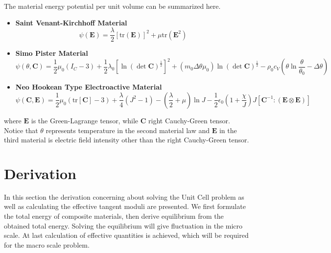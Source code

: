 \documentclass[10pt,a4paper]{scrreprt}
\begin{document}
The material energy potential per unit volume can be summarized here.
\begin{itemize}
	\item[] \textbf{Saint Venant-Kirchhoff Material} \citep{marsden_mathematical_1994}
	\begin{equation}
	\label{eq: svk}
	\psi\left( \mathbf{E} \right) = \dfrac{\lambda}{2} \left[ \text{tr}(\mathbf{E}) \right]^{2} + \mu \text{tr} \left( \mathbf{E}^{2} \right)
	\end{equation}
	\item[] \textbf{Simo Pister Material} \citep{wriggers_coupled_1992}
	\begin{equation}
	\label{eq: sp mat}
	\psi\left( \theta, \mathbf{C} \right) = \frac{1}{2}\mu_{0} \left( I_{C}-3 \right) + \frac{1}{2} \lambda_{0} \left[ \ln \left( \det \mathbf{C} \right)^{\frac{1}{2}} \right]^{2} + \left( m_{0}\Delta \theta \mu_{0}\right) \ln (\det \mathbf{C})^{\frac{1}{2}} - \rho_{0} c_{V} \left( \theta \ln\dfrac{\theta}{\theta_{0}} - \Delta \theta \right)
	\end{equation}
	\item[] \textbf{Neo Hookean Type Electroactive Material} \citep{keip_two-scale_2014}
	\begin{equation}
	\label{eq: nhk}
	\psi\left( \mathbf{C}, \mathbf{E} \right) =  \frac{1}{2}\mu_{0} \left( \text{tr}[\mathbf{C}]-3 \right) + \dfrac{\lambda}{4} \left( J^{2}-1 \right) - \left( \dfrac{\lambda}{2} + \mu \right) \ln J - \frac{1}{2} \epsilon_{0} \left( 1+\dfrac{\chi}{J} \right) J \left[ \mathbf{C}^{-1}: (\mathbf{E} \otimes \mathbf{E}) \right]
	\end{equation}
\end{itemize}
where $\mathbf{E}$ is the Green-Lagrange tensor, while $\mathbf{C}$ right Cauchy-Green tensor. Notice that $\theta$ represents temperature in the second material law and $\mathbf{E}$ in the third material is electric field intensity other than the right Cauchy-Green tensor.

\section{Derivation}
In this section the derivation concerning about solving the Unit Cell problem as well as calculating the effective tangent moduli are presented. We first formulate the total energy of composite materials, then derive equilibrium from the obtained total energy. Solving the equilibrium will give fluctuation in the micro scale. At last calculation of effective quantities is achieved, which will be required for the macro scale problem.
\end{document}
